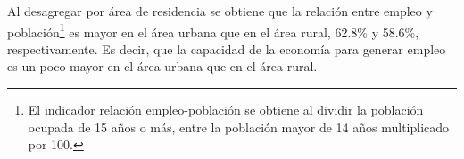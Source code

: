 Al desagregar por área de residencia se obtiene que la relación entre empleo y población\footnote{El indicador relación empleo-población se obtiene al dividir la población ocupada de 15 años o más,  entre la población mayor de 14 años multiplicado por 100.}  es mayor en el área urbana que en el área rural, 62.8\% y 58.6\%, respectivamente. Es decir, que la capacidad de la economía para generar empleo es un poco mayor en el área urbana que en el área rural.
